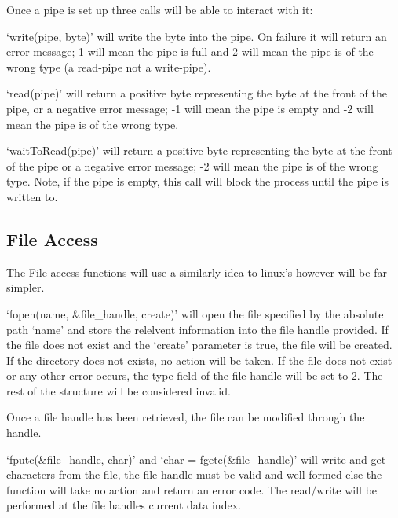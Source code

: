 \documentclass[a4paper]{report}
\begin{document}
\vspace{1.5mm}
\noindent
Once a pipe is set up three calls will be able to interact with it:

\vspace{1.5mm}
\noindent
`write(pipe, byte)' will write the byte into the pipe. On failure it will return an error message; 1 will mean the pipe is full and 2 will mean the pipe is of the wrong type (a read-pipe not a write-pipe).

\vspace{1.5mm}
\noindent
`read(pipe)' will return a positive byte representing the byte at the front of the pipe, or a negative error message; -1 will mean the pipe is empty and -2 will mean the pipe is of the wrong type.

\vspace{1.5mm}
\noindent
`waitToRead(pipe)' will return a positive byte representing the byte at the front of the pipe or a negative error message; -2 will mean the pipe is of the wrong type. Note, if the pipe is empty, this call will block the process until the pipe is written to.


\subsection{File Access}

The File access functions will use a similarly idea to linux's however will be far simpler.

\vspace{1.5mm}
\noindent
`fopen(name, \&file\_handle, create)' will open the file specified by the absolute path `name' and store the relelvent information into the file handle provided. If the file does not exist and the `create' parameter is true, the file will be created. If the directory does not exists, no action will be taken. If the file does not exist or any other error occurs, the type field of the file handle will be set to 2. The rest of the structure will be considered invalid.

\vspace{1.5mm}
\noindent
Once a file handle has been retrieved, the file can be modified through the handle.

\vspace{1.5mm}
\noindent
`fputc(\&file\_handle, char)' and `char = fgetc(\&file\_handle)' will write and get characters from the file, the file handle must be valid and well formed else the function will take no action and return an error code. The read/write will be performed at the file handles current data index.
\end{document}
